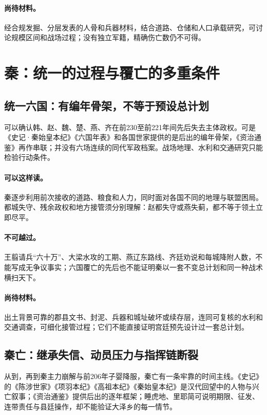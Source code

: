 \paragraph{尚待材料。}经合规发掘、分层发表的人骨和兵器材料，结合道路、仓储和人口承载研究，可讨论规模区间和战场过程；没有独立军籍，精确伤亡数仍不可得。

\section{秦：统一的过程与覆亡的多重条件}

\subsection{统一六国：有编年骨架，不等于预设总计划}

可以确认韩、赵、魏、楚、燕、齐在前230至前221年间先后失去主体政权。可是《史记·秦始皇本纪》《六国年表》和各国世家提供的是后出的编年骨架，《资治通鉴》再作串联；并没有六场连续的同代军政档案。战场地理、水利和交通研究只能检验行动条件。

\paragraph{可以这样读。}秦逐步利用前次接收的道路、粮食和人力，同时面对各国不同的地理与联盟困局。都城失守、残余政权和地方接管须分别理解：赵都失守或燕失蓟，都不等于领土立即尽平。

\paragraph{不可越过。}王翦请兵“六十万”、大梁水攻的工期、燕辽东路线、齐廷劝说和每城降附人数，不能写成无争议事实；六国覆亡的先后也不能证明秦以一套不变总计划和同一种战术横扫天下。

\paragraph{尚待材料。}出土背景可靠的郡县文书、封泥、兵器和城址破坏或续存层，连同可复核的水利和交通调查，可细化接管过程；它们不能直接证明宫廷预先设计过一套总计划。

\subsection{秦亡：继承失信、动员压力与指挥链断裂}

从到，再到秦主力崩解与前206年子婴降服，秦亡有一条牢靠的时间主线。《史记》的《陈涉世家》《项羽本纪》《高祖本纪》《秦始皇本纪》是汉代回望中的人物与兴亡叙事；《资治通鉴》提供后出的逐年框架；睡虎地、里耶简可说明期限、征发、连带责任与县廷操作，却不能验证大泽乡的每一情节。

